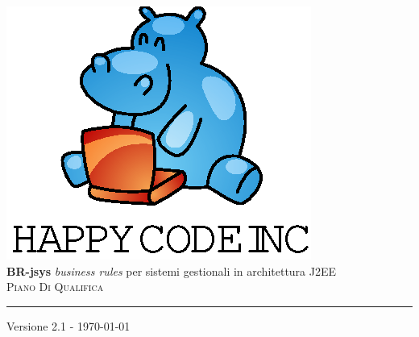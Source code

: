 \documentclass[11pt,titlepage,a4paper]{report}
\begin{document}
\newcommand{\lv}{ 2.1 } %
\newcommand{\dt}{ Piano Di Qualifica }%
\newcommand{\PianoDiProgetto}{ PianoDiProgetto.1.0.pdf }
\newcommand{\Glossario}{ Glossario.1.4.pdf }


\begin{titlepage}\begin{center}
\vspace*{0.5in}
\includegraphics{logo.eps}
\vspace*{0.2in} \\
{\Large \textbf{BR-jsys}}
{\Large \emph{business rules} per sistemi gestionali in architettura J2EE } 
\vspace{2in} \\
\Huge \textsc{ \dt }
\par\rule{10cm}{0.4pt} \par {\large Versione \lv - \today} \\
\end{center}\end{titlepage}
\vspace*{0.5in}
\end{document}
